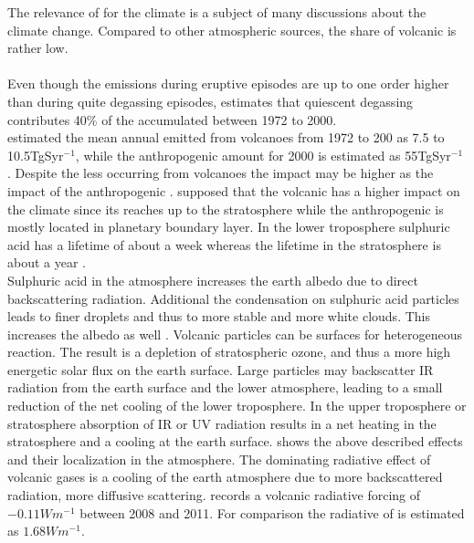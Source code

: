 \documentclass  [
  paper    = a4,
  BCOR     = 10mm,
  twoside,
  fontsize = 12pt,
  fleqn,
  toc      = bibnumbered,
  toc      = listofnumbered,
  numbers  = noendperiod,
  headings = normal,
  listof   = leveldown,
  version  = 3.03
]                                       {scrreprt}
\begin{document}
The relevance of   for the climate is a subject of many discussions about the climate change. Compared to other atmospheric  sources, the share of volcanic   is rather low.\\
\\
Even though the  emissions during eruptive episodes are up to one order higher than during quite degassing episodes, \cite{halmer2002annual} estimates that quiescent degassing contributes 40\% of the accumulated  between 1972 to 2000.\\
\cite{halmer2002annual} estimated the mean annual   emitted from volcanoes from 1972 to 200 as 7.5 to 10.5TgSyr$^{-1}$, while the anthropogenic   amount for 2000 is estimated as 55TgSyr$^{-1}$ \citep{IPCC}. Despite the less   occurring from volcanoes the impact may be higher as the impact of the anthropogenic . \cite{graf1997volcanic} supposed that the volcanic   has a higher impact on the climate since its reaches up to the stratosphere while the anthropogenic   is mostly located in planetary boundary layer. In the lower troposphere sulphuric acid has a lifetime of about a week whereas the lifetime in the stratosphere is about a year \citep{IPCC}.\\
Sulphuric acid in the atmosphere increases the earth albedo due to direct backscattering radiation. Additional the condensation on sulphuric acid particles leads to finer droplets and thus to more stable and more white clouds. This increases the albedo as well \citep{twomey1974pollution}.
Volcanic particles can be surfaces for heterogeneous reaction. The result is a depletion of stratospheric ozone, and thus a more high energetic solar flux on the earth surface.
Large particles may backscatter IR radiation from the earth surface and the lower atmosphere, leading to a small reduction of the net cooling of the lower troposphere.
In the upper troposphere or stratosphere absorption of IR or UV radiation results in a net heating in the stratosphere and a cooling at the earth surface.
 shows the above described effects and their localization in the atmosphere.
The dominating radiative effect of volcanic gases is a cooling of the earth atmosphere due to  more backscattered radiation, more diffusive scattering\citep{robock2000volcanic}.
\cite{IPCC} records a volcanic radiative forcing of $-0.11Wm^{-1}$ between 2008 and 2011. For comparison the radiative of   is estimated as  $1.68Wm^{-1}$.
\end{document}
